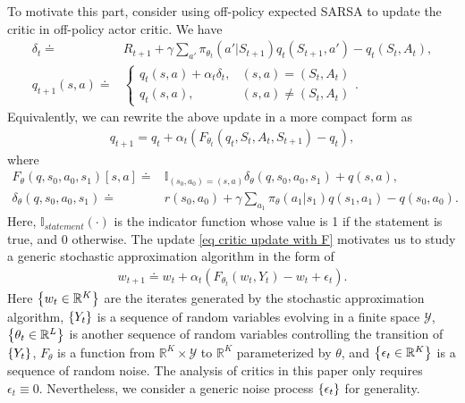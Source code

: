 \documentclass[twoside,11pt]{article}
\newcommand{\fY}{\mathcal{Y}}
\newcommand{\R}{\mathbb{R}}
\numberwithin{assucounter}{section}
\begin{document}
To motivate this part,
consider using off-policy expected SARSA to update the critic in off-policy actor critic.
We have
\begin{align}
  \delta_t \doteq& R_{t+1} + \gamma \sum_{a'} \pi_{\theta_t}(a' | S_{t+1}) q_{t}(S_{t+1}, a') - q_t(S_t, A_t), \\
  q_{t+1}(s, a) \doteq &
  \begin{cases}
    q_t(s, a) + \alpha_t \delta_t, & (s ,a) = (S_t, A_t) \\
    q_t(s, a), & (s, a) \neq (S_t, A_t)
  \end{cases}.
\end{align}
Equivalently,
we can rewrite the above update in a more compact form as
\begin{align}
  \label{eq critic update with F}
  q_{t+1} = q_t + \alpha_t \left(F_{\theta_t}(q_t, S_t, A_t, S_{t+1}) - q_t\right),
\end{align}
where
\begin{align}
  F_\theta(q, s_0, a_0, s_1)[s, a]
  \doteq& \mathbb{I}_{(s_0, a_0) = (s, a)} \delta_\theta(q, s_0, a_0, s_1) + q(s, a),\\
  \delta_\theta(q, s_0, a_0, s_1) 
  \doteq& r(s_0, a_0) + \gamma \sum_{a_1} \pi_{\theta}(a_1 | s_1) q(s_1, a_1) - q(s_0, a_0).
\end{align}
Here, $\mathbb{I}_{statement}(\cdot)$ is the indicator function whose value is 1 if the statement is true, and 0 otherwise.
The update \eqref{eq critic update with F} motivates us to study a generic stochastic approximation algorithm in the form of
\begin{align}
    \label{eq sa iterates}
    w_{t+1} \doteq w_t + \alpha_t (F_{\theta_t}(w_t, Y_t) - w_t + \epsilon_t).
\end{align}
Here $\qty{w_t \in \R^K}$ are the iterates generated by the stochastic approximation algorithm,
$\qty{Y_t}$ is a sequence of random variables evolving in a finite space $\fY$,
$\qty{\theta_t \in \R^L}$ is another sequence of random variables controlling the transition of $\qty{Y_t}$,
$F_\theta$ is a function from $\R^K \times \fY$ to $\R^K$ parameterized by $\theta$,
and $\qty{\epsilon_t \in \R^K}$ is a sequence of random noise. 
The analysis of critics in this paper only requires $\epsilon_t \equiv 0$.
Nevertheless, we consider a generic noise process $\qty{\epsilon_t}$ for generality.
\end{document}
